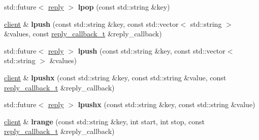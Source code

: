 \begin{DoxyCompactItemize}
\item 
\mbox{\label{classcpp__redis_1_1client_ab6ebbc7b2e6f43f2b5607a4b5471694e}} 
std\+::future$<$ \mbox{\hyperlink{classcpp__redis_1_1reply}{reply}} $>$ {\bfseries lpop} (const std\+::string \&key)
\item 
\mbox{\label{classcpp__redis_1_1client_a0dd04ea38709dd51ae5f39de62d01c70}} 
\mbox{\hyperlink{classcpp__redis_1_1client}{client}} \& {\bfseries lpush} (const std\+::string \&key, const std\+::vector$<$ std\+::string $>$ \&values, const \mbox{\hyperlink{classcpp__redis_1_1client_af7a65eb21aa25230bfbb0b0203c4fc04}{reply\+\_\+callback\+\_\+t}} \&reply\+\_\+callback)
\item 
\mbox{\label{classcpp__redis_1_1client_ac5859a6b63200a4a79574187a7155feb}} 
std\+::future$<$ \mbox{\hyperlink{classcpp__redis_1_1reply}{reply}} $>$ {\bfseries lpush} (const std\+::string \&key, const std\+::vector$<$ std\+::string $>$ \&values)
\item 
\mbox{\label{classcpp__redis_1_1client_ab0a9a2b92f53f774ce4e345b42a403d0}} 
\mbox{\hyperlink{classcpp__redis_1_1client}{client}} \& {\bfseries lpushx} (const std\+::string \&key, const std\+::string \&value, const \mbox{\hyperlink{classcpp__redis_1_1client_af7a65eb21aa25230bfbb0b0203c4fc04}{reply\+\_\+callback\+\_\+t}} \&reply\+\_\+callback)
\item 
\mbox{\label{classcpp__redis_1_1client_af9a3e05f5bd6d4ebb3138dc09f8d0d4e}} 
std\+::future$<$ \mbox{\hyperlink{classcpp__redis_1_1reply}{reply}} $>$ {\bfseries lpushx} (const std\+::string \&key, const std\+::string \&value)
\item 
\mbox{\label{classcpp__redis_1_1client_a9e85cce8555274f7bc706a13911b4579}} 
\mbox{\hyperlink{classcpp__redis_1_1client}{client}} \& {\bfseries lrange} (const std\+::string \&key, int start, int stop, const \mbox{\hyperlink{classcpp__redis_1_1client_af7a65eb21aa25230bfbb0b0203c4fc04}{reply\+\_\+callback\+\_\+t}} \&reply\+\_\+callback)
\item 
\mbox{\label{classcpp__redis_1_1client_a1e7c8d099459af438cc4ed215afef066}} 

\end{DoxyCompactItemize}
